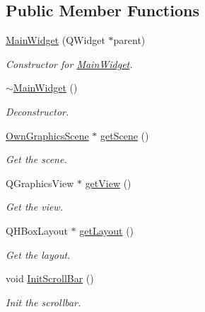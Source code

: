 \subsection*{Public Member Functions}
\begin{DoxyCompactItemize}
\item 
\mbox{\hyperlink{classMainWidget_a62f5aa5fe2314c6221ac49b328b72e8b}{Main\+Widget}} (Q\+Widget $\ast$parent)
\begin{DoxyCompactList}\small\item\em Constructor for \mbox{\hyperlink{classMainWidget}{Main\+Widget}}. \end{DoxyCompactList}\item 
\mbox{\label{classMainWidget_add21c63f8e799303a21a69da3d288c2f}} 
\mbox{\hyperlink{classMainWidget_add21c63f8e799303a21a69da3d288c2f}{$\sim$\+Main\+Widget}} ()
\begin{DoxyCompactList}\small\item\em Deconstructor. \end{DoxyCompactList}\item 
\mbox{\hyperlink{classOwnGraphicsScene}{Own\+Graphics\+Scene}} $\ast$ \mbox{\hyperlink{classMainWidget_ad40a8bd13b501a0ebe88c87426a5b591}{get\+Scene}} ()
\begin{DoxyCompactList}\small\item\em Get the scene. \end{DoxyCompactList}\item 
Q\+Graphics\+View $\ast$ \mbox{\hyperlink{classMainWidget_ae73e3dac6fb1e99dabe84aab683b3fbd}{get\+View}} ()
\begin{DoxyCompactList}\small\item\em Get the view. \end{DoxyCompactList}\item 
Q\+H\+Box\+Layout $\ast$ \mbox{\hyperlink{classMainWidget_a639b465bb49eb31e1c09051ae047951f}{get\+Layout}} ()
\begin{DoxyCompactList}\small\item\em Get the layout. \end{DoxyCompactList}\item 
void \mbox{\hyperlink{classMainWidget_af544f3b04a81d63c0810a90706773d3d}{Init\+Scroll\+Bar}} ()
\begin{DoxyCompactList}\small\item\em Init the scrollbar. \end{DoxyCompactList}\end{DoxyCompactItemize}


